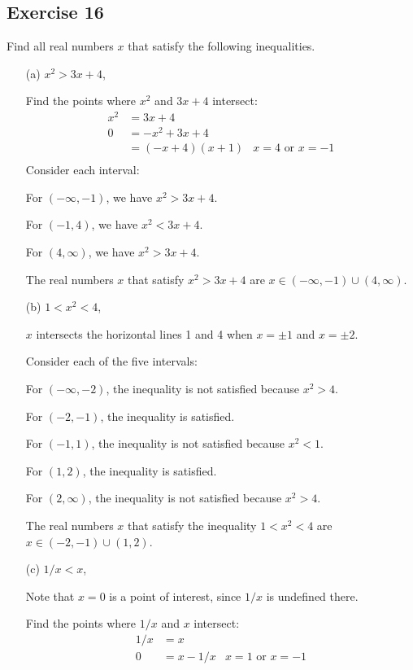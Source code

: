 \documentclass[12pt]{article}
\begin{document}
\subsection*{Exercise 16}
Find all real numbers $x$ that satisfy the following inequalities.
\begin{itemize}
\item[(a)] $x^2 > 3x + 4$,

Find the points where $x^2$ and $3x + 4$ intersect:
\begin{align*}
x^2 &= 3x + 4 \\
0 &= -x^2 + 3x + 4 \\
&= \left(-x + 4\right) \left(x + 1\right) & \text{$x = 4$ or $x = -1$}\\
\end{align*}
Consider each interval:

For $\left(-\infty, -1\right)$, we have $x^2 > 3x+4$.

For $\left(-1, 4\right)$, we have $x^2 < 3x+4$.

For $\left(4, \infty\right)$, we have $x^2 > 3x+4$.

The real numbers $x$ that satisfy $x^2 > 3x + 4$ are $x \in \left(-\infty, -1\right) \cup \left(4, \infty\right)$.
\item[(b)] $1 < x^2 < 4$,

$x$ intersects the horizontal lines 1 and 4 when $x = \pm 1$ and $x = \pm 2$.

Consider each of the five intervals:

For $\left(-\infty, -2\right)$, the inequality is not satisfied because $x^2 > 4$.

For $\left(-2, -1\right)$, the inequality is satisfied.

For $\left(-1, 1\right)$, the inequality is not satisfied because $x^2 < 1$.

For $\left(1, 2\right)$, the inequality is satisfied.

For $\left(2, \infty\right)$, the inequality is not satisfied because $x^2 > 4$.

The real numbers $x$ that satisfy the inequality $1 < x^2 < 4$ are $x \in \left(-2, -1\right) \cup \left(1, 2\right)$.
\item[(c)] $1/x < x$,

Note that $x = 0$ is a point of interest, since $1/x$ is undefined there.

Find the points where $1/x$ and $x$ intersect:
\begin{align*}
1/x &= x \\
0 &= x - 1/x & \text{$x = 1$ or $x = -1$}
\end{align*}


\end{itemize}
\end{document}
